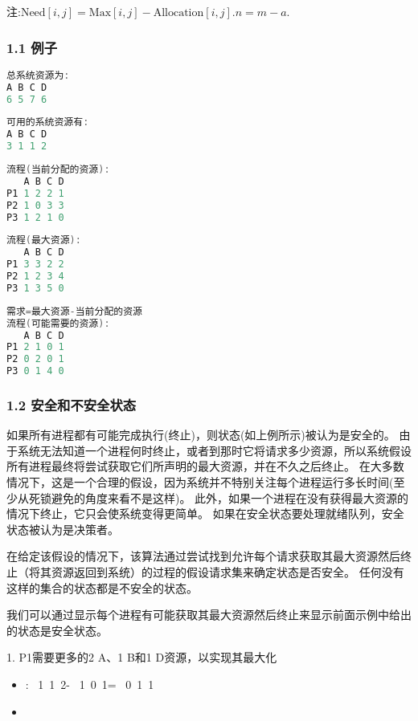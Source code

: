 注:$\text{Need}[i, j] = \text{Max}[i, j] - \text{Allocation}[i, j].n=m-a.$
\subsubsection{1.1 例子}
\begin{lstlisting}[language=cpp]
总系统资源为:
A B C D
6 5 7 6
\end{lstlisting}
\begin{lstlisting}[language=cpp]
可用的系统资源有:
A B C D
3 1 1 2
\end{lstlisting}
\begin{lstlisting}[language=cpp]
流程(当前分配的资源):
   A B C D
P1 1 2 2 1
P2 1 0 3 3
P3 1 2 1 0
\end{lstlisting}
\begin{lstlisting}[language=cpp]
流程(最大资源):
   A B C D
P1 3 3 2 2
P2 1 2 3 4
P3 1 3 5 0
\end{lstlisting}
\begin{lstlisting}[language=cpp]
需求=最大资源-当前分配的资源
流程(可能需要的资源):
   A B C D
P1 2 1 0 1
P2 0 2 0 1
P3 0 1 4 0
\end{lstlisting}
\subsubsection{1.2 安全和不安全状态}
如果所有进程都有可能完成执行(终止)，则状态(如上例所示)被认为是安全的。 由于系统无法知道一个进程何时终止，或者到那时它将请求多少资源，所以系统假设所有进程最终将尝试获取它们所声明的最大资源，并在不久之后终止。 在大多数情况下，这是一个合理的假设，因为系统并不特别关注每个进程运行多长时间(至少从死锁避免的角度来看不是这样)。 此外，如果一个进程在没有获得最大资源的情况下终止，它只会使系统变得更简单。 如果在安全状态要处理就绪队列，安全状态被认为是决策者。

在给定该假设的情况下，该算法通过尝试找到允许每个请求获取其最大资源然后终止（将其资源返回到系统）的过程的假设请求集来确定状态是否安全。 任何没有这样的集合的状态都是不安全的状态。

我们可以通过显示每个进程有可能获取其最大资源然后终止来显示前面示例中给出的状态是安全状态。

1. P1需要更多的2 A、1 B和1 D资源，以实现其最大化
    \begin{itemize}
        \item {}: \ 1\ 1\ 2\rangle - \ 1\ 0\ 1\rangle = \ 0\ 1\ 1\rangle
        \item {}
    \end{itemize}

